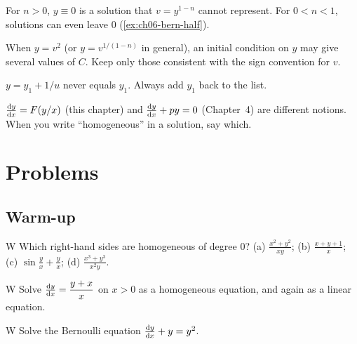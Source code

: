 \begin{pitfall}\label{pit:ch06-bern-zero}
For $n>0$, $y\equiv0$ is a solution that $v = y^{1-n}$ cannot represent. For
$0<n<1$, solutions can even leave $0$ (\cref{ex:ch06-bern-half}).
\end{pitfall}

\begin{pitfall}\label{pit:ch06-spurious}
When $y = v^2$ (or $y = v^{1/(1-n)}$ in general), an initial condition on $y$
may give several values of $C$. Keep only those consistent with the sign
convention for $v$.
\end{pitfall}

\begin{pitfall}\label{pit:ch06-riccati-lost}
$y = y_1 + 1/u$ never equals $y_1$. Always add $y_1$ back to the list.
\end{pitfall}

\begin{pitfall}\label{pit:ch06-homog-name}
$\frac{\mathrm{d}y}{\mathrm{d}x} = F(y/x)$ (this chapter) and $\frac{\mathrm{d}y}{\mathrm{d}x} + py = 0$ (Chapter~4) are different
notions. When you write ``homogeneous'' in a solution, say which.
\end{pitfall}

\section{Problems}\label{sec:ch06-problems}

\subsection*{Warm-up}

\begin{problem}{W}\label{prob:ch06-w1}
Which right-hand sides are homogeneous of degree $0$?
(a) $\frac{x^2+y^2}{xy}$; (b) $\frac{x + y + 1}{x}$;
(c) $\sin\frac yx + \frac yx$; (d) $\frac{x^3 + y^3}{x^2y}$.
\end{problem}

\begin{problem}{W}\label{prob:ch06-w2}
Solve $\frac{\mathrm{d}y}{\mathrm{d}x} = \dfrac{y + x}{x}$ on $x>0$ as a homogeneous equation, and
again as a linear equation.
\end{problem}

\begin{problem}{W}\label{prob:ch06-w3}
Solve the Bernoulli equation $\frac{\mathrm{d}y}{\mathrm{d}x} + y = y^2$.
\end{problem}

